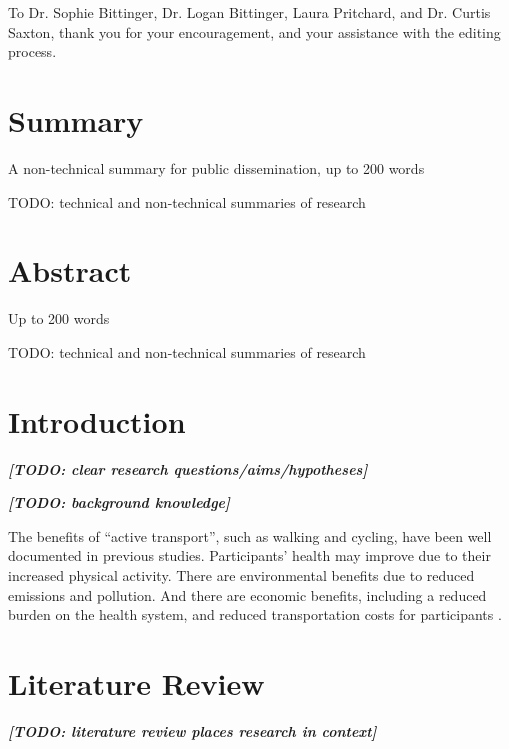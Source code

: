 \documentclass[11pt,twoside]{report}
\newcommand{\remark}[1]{{\bf \em [\marginpar{$\Leftarrow$}#1]}}
\begin{document}
To Dr. Sophie Bittinger, Dr. Logan Bittinger, Laura Pritchard, and Dr. Curtis Saxton, thank you for your encouragement, and your assistance with the editing process.



\chapter*{Summary}

A non-technical summary for public dissemination, up to 200 words

TODO: technical and non-technical summaries of research

\chapter*{Abstract}

Up to 200 words

TODO: technical and non-technical summaries of research


\tableofcontents
\listoffigures
\listoftables


\chapter{Introduction}

\remark{TODO: clear research questions/aims/hypotheses}

\remark{TODO: background knowledge}

The benefits of ``active transport'', such as walking and cycling, have been well documented in previous studies.  Participants' health may improve due to their increased physical activity.  There are environmental benefits due to reduced emissions and pollution.  And there are economic benefits, including a reduced burden on the health system, and reduced transportation costs for participants \cite{LEE2012219} \cite{RABL2012121}.


\chapter{Literature Review}

\remark{TODO: literature review places research in context}
\end{document}
